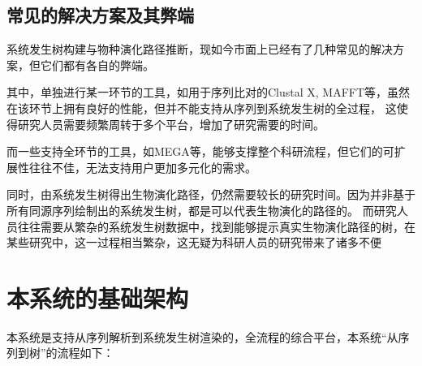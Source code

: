 \documentclass{article}
\begin{document}
\begin{multicols}{2}
\subsection{常见的解决方案及其弊端}
\par
系统发生树构建与物种演化路径推断，现如今市面上已经有了几种常见的解决方案，但它们都有各自的弊端。
\par
其中，单独进行某一环节的工具，如用于序列比对的Clustal X, MAFFT等\cite{ref1}，虽然在该环节上拥有良好的性能，但并不能支持从序列到系统发生树的全过程，
这使得研究人员需要频繁周转于多个平台，增加了研究需要的时间。
\par
而一些支持全环节的工具，如MEGA等，能够支撑整个科研流程，但它们的可扩展性往往不佳，无法支持用户更加多元化的需求。
\par
同时，由系统发生树得出生物演化路径，仍然需要较长的研究时间。因为并非基于所有同源序列绘制出的系统发生树，都是可以代表生物演化的路径的。
而研究人员往往需要从繁杂的系统发生树数据中，找到能够提示真实生物演化路径的树，在某些研究中，这一过程相当繁杂，这无疑为科研人员的研究带来了诸多不便

\section{本系统的基础架构}
\par
本系统是支持从序列解析到系统发生树渲染的，全流程的综合平台，本系统“从序列到树”的流程如下：



\end{multicols}
\end{document}
